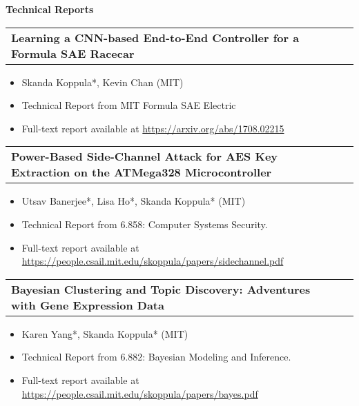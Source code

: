 \documentclass[letterpaper,11pt]{article}
\makeatletter
\newcommand{\resitem}[1]{\item[--] #1 \vspace{-4pt}}
\newcommand{\ressubheadingtwo}[2] {
\begin{tabular*}{7in}{l@{\extracolsep{\fill}}r}
	\textbf{#1} & \textit{#2} \\
\end{tabular*}\vspace{-6pt}}
\makeatother
\begin{document}
\vspace{0.2in}

\large \textbf{Technical Reports\vspace{0.2in}}
\normalsize

\ressubheadingtwo{Learning a CNN-based End-to-End Controller for a Formula SAE Racecar}{}
\begin{itemize}
    \itemsep0em
    \resitem{Skanda Koppula*, Kevin Chan (MIT)}
    \resitem{Technical Report from MIT Formula SAE Electric}
    \resitem{Full-text report available at \url{https://arxiv.org/abs/1708.02215}}
\end{itemize}
\vspace{0.1in}

\ressubheadingtwo{Power-Based Side-Channel Attack for AES Key Extraction on the ATMega328 Microcontroller}{}
\begin{itemize}
    \itemsep0em
    \resitem{Utsav Banerjee*, Lisa Ho*, Skanda Koppula* (MIT)}
    \resitem{Technical Report from 6.858: Computer Systems Security.}
    \resitem{Full-text report available at \url{https://people.csail.mit.edu/skoppula/papers/sidechannel.pdf}}
\end{itemize}
\vspace{0.1in}

\ressubheadingtwo{Bayesian Clustering and Topic Discovery: Adventures with Gene Expression Data}{}
\begin{itemize}
    \itemsep0em
    \resitem{Karen Yang*, Skanda Koppula* (MIT)}
    \resitem{Technical Report from 6.882: Bayesian Modeling and Inference.}
    \resitem{Full-text report available at \url{https://people.csail.mit.edu/skoppula/papers/bayes.pdf}}
\end{itemize}
\vspace{0.1in}
\end{document}
